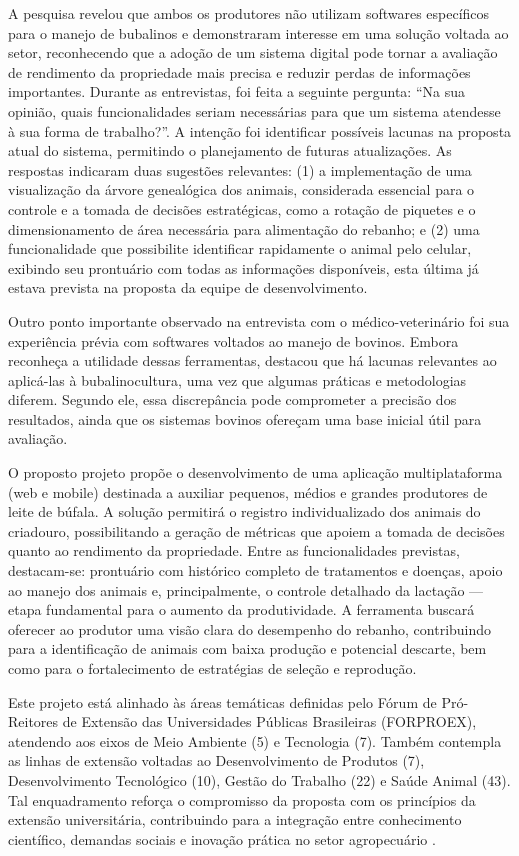 A pesquisa revelou que ambos os produtores não utilizam softwares específicos para o manejo de bubalinos e demonstraram interesse em uma solução voltada ao setor, reconhecendo que a adoção de um sistema digital pode tornar a avaliação de rendimento da propriedade mais precisa e reduzir perdas de informações importantes. Durante as entrevistas, foi feita a seguinte pergunta: “Na sua opinião, quais funcionalidades seriam necessárias para que um sistema atendesse à sua forma de trabalho?”. A intenção foi identificar possíveis lacunas na proposta atual do sistema, permitindo o planejamento de futuras atualizações. As respostas indicaram duas sugestões relevantes: (1) a implementação de uma visualização da árvore genealógica dos animais, considerada essencial para o controle e a tomada de decisões estratégicas, como a rotação de piquetes e o dimensionamento de área necessária para alimentação do rebanho; e (2) uma funcionalidade que possibilite identificar rapidamente o animal pelo celular, exibindo seu prontuário com todas as informações disponíveis,  esta última já estava prevista na proposta da equipe de desenvolvimento.

Outro ponto importante observado na entrevista com o médico-veterinário foi sua experiência prévia com softwares voltados ao manejo de bovinos. Embora reconheça a utilidade dessas ferramentas, destacou que há lacunas relevantes ao aplicá-las à bubalinocultura, uma vez que algumas práticas e metodologias diferem. Segundo ele, essa discrepância pode comprometer a precisão dos resultados, ainda que os sistemas bovinos ofereçam uma base inicial útil para avaliação.

O proposto projeto propõe o desenvolvimento de uma aplicação multiplataforma (web e mobile) destinada a auxiliar pequenos, médios e grandes produtores de leite de búfala. A solução permitirá o registro individualizado dos animais do criadouro, possibilitando a geração de métricas que apoiem a tomada de decisões quanto ao rendimento da propriedade. Entre as funcionalidades previstas, destacam-se: prontuário com histórico completo de tratamentos e doenças, apoio ao manejo dos animais e, principalmente, o controle detalhado da lactação — etapa fundamental para o aumento da produtividade. A ferramenta buscará oferecer ao produtor uma visão clara do desempenho do rebanho, contribuindo para a identificação de animais com baixa produção e potencial descarte, bem como para o fortalecimento de estratégias de seleção e reprodução.

Este projeto está alinhado às áreas temáticas definidas pelo Fórum de Pró-Reitores de Extensão das Universidades Públicas Brasileiras (FORPROEX), atendendo aos eixos de Meio Ambiente (5) e Tecnologia (7). Também contempla as linhas de extensão voltadas ao Desenvolvimento de Produtos (7), Desenvolvimento Tecnológico (10), Gestão do Trabalho (22) e Saúde Animal (43). Tal enquadramento reforça o compromisso da proposta com os princípios da extensão universitária, contribuindo para a integração entre conhecimento científico, demandas sociais e inovação prática no setor agropecuário \cite{FORPROEX}.